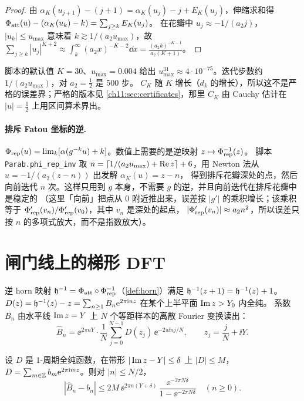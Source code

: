 \begin{proof}
由 $\alpha_K(u_{j+1})-(j+1)=\alpha_K(u_j)-j+E_K(u_j)$，伸缩求和得 $\Phi_{\mathrm{att}}(u)-(\alpha_K(u_k)-k)=\sum_{j\ge k}E_K(u_j)$。
在花瓣中 $u_j\approx-1/(a_2j)$，$|u_k|\le u_{\max}$ 意味着 $k\gtrsim1/(a_2u_{\max})$，故
$\sum_{j\ge k}|u_j|^{K+2}\approx\int_k^\infty(a_2x)^{-K-2}\dd x=\frac{(a_2k)^{-K-1}}{a_2(K+1)}$。
\end{proof}

脚本的默认值 $K=30$、$u_{\max}=0.004$ 给出 $u_{\max}^{31}\approx4\cdot10^{-75}$。迭代步数约 $1/(a_2u_{\max})$，对 $a_2=\tfrac12$ 是 $500$ 步。
$C_K$ 随 $K$ 增长（$d_k$ 的增长），所以这不是严格的误差界；严格的版本见 \cref{ch11:sec:certificates}，那里 $C_K$ 由 Cauchy 估计在 $|u|=\tfrac12$ 上用区间算术界出。

\paragraph{排斥 Fatou 坐标的逆.} $\Phi_{\mathrm{rep}}(u)=\lim_k[\alpha(g^{-k}u)+k]$。数值上需要的是逆映射 $z\mapsto\Phi_{\mathrm{rep}}^{-1}(z)$。
脚本 \texttt{Parab.phi\_\allowbreak{}rep\_\allowbreak{}inv} 取 $n=\lceil1/(a_2u_{\max})+\operatorname{Re} z\rceil+6$，用 Newton 法从 $u=-1/(a_2(z-n))$ 出发解 $\alpha_K(u)=z-n$，
得到排斥花瓣深处的点，然后向前迭代 $n$ 次。这样只用到 $g$ 本身，不需要 $g$ 的逆，并且向前迭代在排斥花瓣中是稳定的
（这里「向前」把点从 $0$ 附近推出来，误差按 $|g'|$ 的乘积增长；该乘积等于 $\Phi_{\mathrm{rep}}'(v_n)/\Phi_{\mathrm{rep}}'(v_0)$，其中 $v_n$ 是深处的起点，
$|\Phi_{\mathrm{rep}}'(v_n)|\approx a_2n^2$，所以误差只按 $n$ 的多项式放大，而不是指数放大）。

\section{闸门线上的梯形 DFT}\label{ch11:sec:dft}

逆 horn 映射 $\mathfrak h^{-1}=\Phi_{\mathrm{att}}\circ\Phi_{\mathrm{rep}}^{-1}$（\cref{def:horn}）满足 $\mathfrak h^{-1}(z+1)=\mathfrak h^{-1}(z)+1$。
$D(z)=\mathfrak h^{-1}(z)-z=\sum_{n\ge1}B_n\mathrm{e}^{2\pi\mathrm{i} nz}$ 在某个上半平面 $\operatorname{Im} z>Y_0$ 内全纯。
系数 $B_n$ 由水平线 $\operatorname{Im} z=Y$ 上 $N$ 个等距样本的离散 Fourier 变换读出：
\[
 \hat B_n=\ee^{2\pi nY}\cdot\frac1N\sum_{j=0}^{N-1}D(z_j)\,\ee^{-2\pi\ii nj/N},\qquad z_j=\frac jN+\ii Y .
\]

\begin{lemma}[周期梯形法的混叠界]\label{ch11:lem:alias}
设 $D$ 是 $1$-周期全纯函数，在带形 $|\operatorname{Im} z-Y|\le\delta$ 上 $|D|\le M$，$D=\sum_{m\in\mathbb{Z}}b_m\mathrm{e}^{2\pi\mathrm{i} mz}$。则对 $|n|\le N/2$，
\[
 |\hat B_n-b_n|\le2M\,\ee^{2\pi n(Y+\delta)}\,\frac{\ee^{-2\pi N\delta}}{1-\ee^{-2\pi N\delta}}\quad(n\ge0).
\]
\end{lemma}

